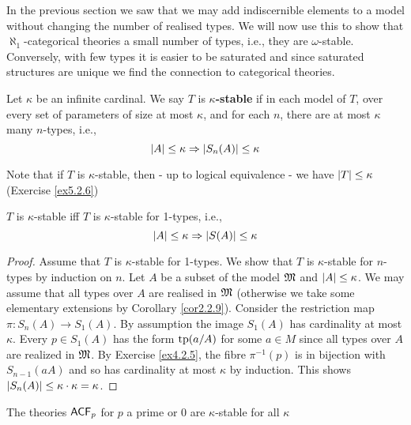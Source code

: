 \documentclass[11pt]{article}
\begin{document}
In the previous section we saw that we may add indiscernible elements to a model without
changing the number of realised types. We will now use this to show that \(\aleph_1\)-categorical
theories a small number of types, i.e., they are \(\omega\)-stable. Conversely, with few types it is
easier to be saturated and since saturated structures are unique we find the connection to
categorical theories.

\begin{definition}[]
Let \(\kappa\) be an infinite cardinal. We say \(T\) is \textbf{\(\kappa\)-stable} if in each model of \(T\), over
every set of parameters of size at most \(\kappa\), and for each \(n\), there are at most \(\kappa\)
many \(n\)-types, i.e.,
\begin{equation*}
\abs{A}\le\kappa\Rightarrow\abs{S_n(A)}\le\kappa
\end{equation*}
\end{definition}

Note that if \(T\) is \(\kappa\)-stable, then - up to logical equivalence - we have \(\abs{T}\le\kappa\)
(Exercise \ref{ex5.2.6})

\begin{lemma}[]
\label{lemma5.2.2}
\(T\) is \(\kappa\)-stable iff \(T\) is \(\kappa\)-stable for 1-types, i.e.,
\begin{equation*}
 \abs{A}\le\kappa\Rightarrow\abs{S(A)}\le\kappa
\end{equation*}
\end{lemma}

\begin{proof}
Assume that \(T\) is \(\kappa\)-stable for 1-types. We show that \(T\) is \(\kappa\)-stable for \(n\)-types by
induction on \(n\). Let \(A\) be a subset of the model \(\mathfrak{M}\) and \(\abs{A}\le\kappa\). We may assume
that all types over \(A\) are realised in \(\mathfrak{M}\) (otherwise we take some elementary extensions by
Corollary \ref{cor2.2.9}). Consider the restriction map \(\pi:S_n(A)\to S_1(A)\). By assumption the
image \(S_1(A)\) has cardinality at most \(\kappa\).
Every \(p\in S_1(A)\) has the form \(\operatorname{tp}(a/A)\) for some \(a\in M\) since all types over \(A\) are
realized in \(\mathfrak{M}\). By Exercise \ref{ex4.2.5}, the fibre \(\pi^{-1}(p)\) is in bijection
with \(S_{n-1}(aA)\) and so has cardinality at most \(\kappa\) by induction. This shows \(\abs{S_n(A)}\le\kappa\cdot\kappa=\kappa\).
\end{proof}

\begin{examplle}
The theories \(\textsf{ACF}_p\) for \(p\) a prime or 0 are \(\kappa\)-stable for all \(\kappa\)
\end{examplle}
\end{document}
